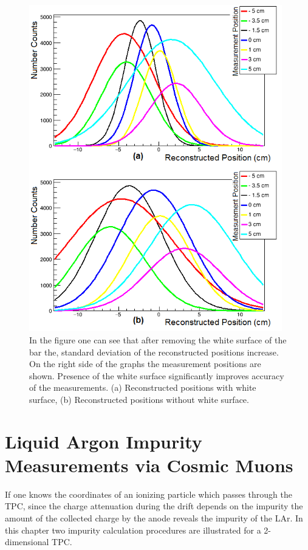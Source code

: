 \documentclass[a4paper]{article}\linespread{1.4}
\begin{document}
\begin{figure}[] \centering \includegraphics[width=110mm,scale=1.0]{rwcc.png} \caption{In the figure one can see that after removing the white surface of the bar the, standard deviation of the reconstructed positions increase. On the right side of the graphs the measurement positions are shown. Presence of the white surface significantly improves accuracy of the measurements. (a) Reconstructed positions with white surface, (b) Reconstructed positions without white surface. } \label{fig:rwcc} \end{figure}   

\clearpage
\newpage\null\thispagestyle{empty}
\section{Liquid Argon Impurity Measurements via Cosmic Muons}
\label{chap:pur}
If one knows the coordinates of an ionizing particle which passes through the TPC, since the charge attenuation during the drift depends on the impurity the amount of the collected charge by the anode reveals the impurity of the LAr. In this chapter two impurity calculation procedures are illustrated for a 2-dimensional TPC.
\end{document}
